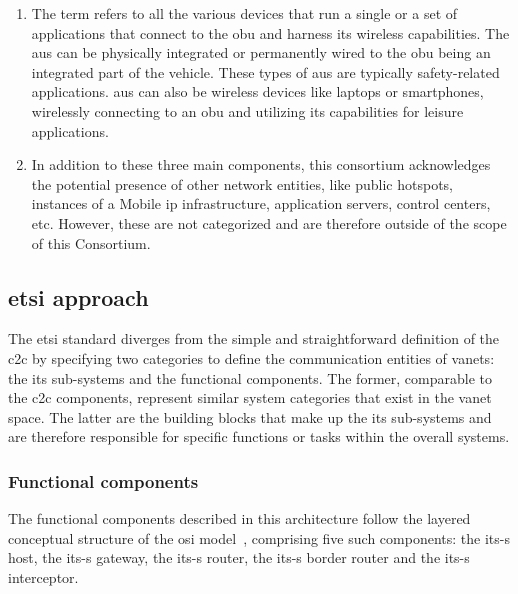 \begin{enumerate}
	\item The term  refers to all the various devices that run a single or a set of applications that connect to the \gls{obu} and harness its wireless capabilities. The \glspl{au} can be physically integrated or permanently wired to the \gls{obu} being an integrated part of the vehicle. These types of \glspl{au} are typically safety-related applications. \glspl{au} can also be wireless devices like laptops or smartphones, wirelessly connecting to an \gls{obu} and utilizing its capabilities for leisure applications.

    \item In addition to these three main components, this consortium acknowledges the potential presence of other network entities, like public hotspots, instances of a Mobile \gls{ip} infrastructure, application servers, control centers, etc. However, these are not categorized and are therefore outside of the scope of this Consortium.

\end{enumerate}

\subsection[ETSI approach]{\gls{etsi} approach}

The \gls{etsi} standard diverges from the simple and straightforward definition of the \gls{c2c} by specifying two categories to define the communication entities of \glspl{vanet}: the \gls{its} sub-systems and the functional components. The former, comparable to the \gls{c2c} components, represent similar system categories that exist in the \gls{vanet} space. The latter are the building blocks that make up the \gls{its} sub-systems and are therefore responsible for specific functions or tasks within the overall systems.

\subsubsection{Functional components}

The functional components described in this architecture follow the layered conceptual structure of the \gls{osi} model~\cite{etsi_intelligent_2010}, comprising five such components: the \gls{its-s} host, the \gls{its-s} gateway, the \gls{its-s} router, the \gls{its-s} border router and the \gls{its-s} interceptor.


